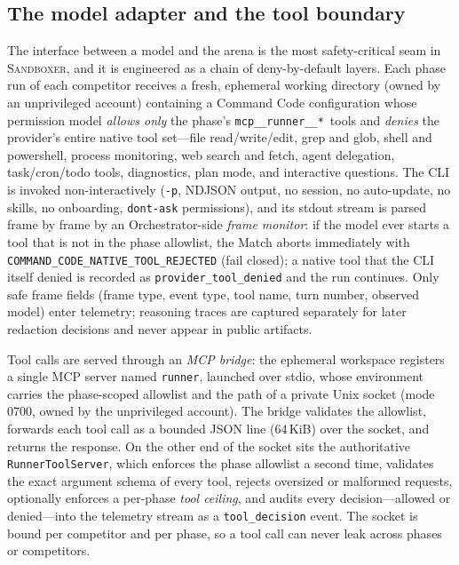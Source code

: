 \documentclass[11pt]{article}
\newcommand{\sandboxer}{\textsc{Sandboxer}}
\begin{document}
\subsection{The model adapter and the tool boundary}
\label{sec:harness}

The interface between a model and the arena is the most safety-critical seam in
\sandboxer{}, and it is engineered as a chain of deny-by-default layers. Each
phase run of each competitor receives a fresh, ephemeral working directory
(owned by an unprivileged account) containing a Command Code configuration
whose permission model \emph{allows only} the phase's
\texttt{mcp\_\_runner\_\_*}\ tools and \emph{denies} the provider's entire
native tool set---file
read/write/edit, grep and glob, shell and powershell, process monitoring, web
search and fetch, agent delegation, task/cron/todo tools, diagnostics, plan
mode, and interactive questions. The CLI is invoked non-interactively
(\texttt{-p}, NDJSON output, no session, no auto-update, no skills, no
onboarding, \texttt{dont-ask} permissions), and its stdout stream is parsed
frame by frame by an Orchestrator-side \emph{frame monitor}: if the model ever
starts a tool that is not in the phase allowlist, the Match aborts immediately
with \texttt{COMMAND\_CODE\_NATIVE\_TOOL\_REJECTED} (fail closed); a native tool
that the CLI itself denied is recorded as \texttt{provider\_tool\_denied} and
the run continues. Only safe frame fields (frame type, event type, tool name,
turn number, observed model) enter telemetry; reasoning traces are captured
separately for later redaction decisions and never appear in public artifacts.

Tool calls are served through an \emph{MCP bridge}: the ephemeral workspace
registers a single MCP server named \texttt{runner}, launched over stdio, whose
environment carries the phase-scoped allowlist and the path of a private Unix
socket (mode 0700, owned by the unprivileged account). The bridge validates the
allowlist, forwards each tool call as a bounded JSON line (64\,KiB) over the
socket, and returns the response. On the other end of the socket sits the
authoritative \texttt{RunnerToolServer}, which enforces the phase allowlist a
second time, validates the exact argument schema of every tool, rejects
oversized or malformed requests, optionally enforces a per-phase \emph{tool
ceiling}, and audits every decision---allowed or denied---into the telemetry
stream as a \texttt{tool\_decision} event. The socket is bound per competitor
and per phase, so a tool call can never leak across phases or competitors.
\end{document}
